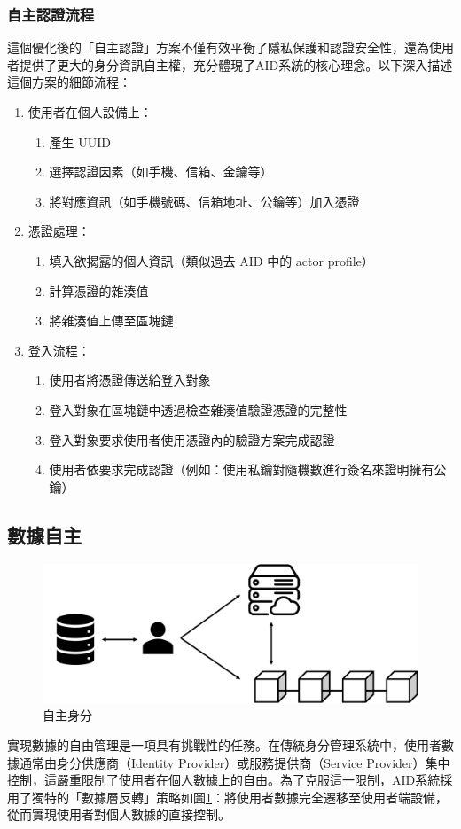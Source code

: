 \subsubsection{自主認證流程}
這個優化後的「自主認證」方案不僅有效平衡了隱私保護和認證安全性，還為使用者提供了更大的身分資訊自主權，充分體現了AID系統的核心理念。以下深入描述這個方案的細節流程：
\begin{enumerate}
  \item 使用者在個人設備上：
        \begin{enumerate}
          \item 產生 UUID
          \item 選擇認證因素（如手機、信箱、金鑰等）
          \item 將對應資訊（如手機號碼、信箱地址、公鑰等）加入憑證
        \end{enumerate}

  \item 憑證處理：
        \begin{enumerate}
          \item 填入欲揭露的個人資訊（類似過去 AID 中的 actor profile）
          \item 計算憑證的雜湊值
          \item 將雜湊值上傳至區塊鏈
        \end{enumerate}

  \item 登入流程：
        \begin{enumerate}
          \item 使用者將憑證傳送給登入對象
          \item 登入對象在區塊鏈中透過檢查雜湊值驗證憑證的完整性
          \item 登入對象要求使用者使用憑證內的驗證方案完成認證
          \item 使用者依要求完成認證（例如：使用私鑰對隨機數進行簽名來證明擁有公鑰）
        \end{enumerate}
\end{enumerate}
\subsection{數據自主}
\begin{figure}
  \centering
  \includegraphics[width=\linewidth,keepaspectratio]{figures/aid.png}
  \caption{自主身分}
  \label{fig:aid}
\end{figure}
實現數據的自由管理是一項具有挑戰性的任務。在傳統身分管理系統中，使用者數據通常由身分供應商（Identity Provider）或服務提供商（Service Provider）集中控制，這嚴重限制了使用者在個人數據上的自由。為了克服這一限制，AID系統採用了獨特的「數據層反轉」策略如圖\ref{fig:aid}：將使用者數據完全遷移至使用者端設備，從而實現使用者對個人數據的直接控制。

